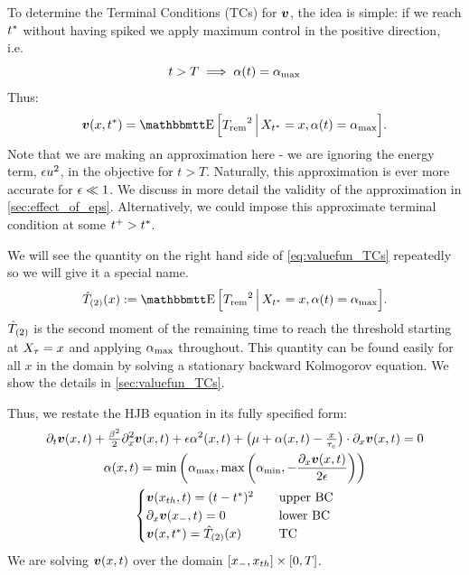 \documentclass[12pt]{iopart}
\begin{document}
To determine the Terminal Conditions (TCs) for ${ \boldsymbol{v} }$, the idea is
simple: if we reach ${ t^* }$ without having spiked we apply maximum control in the
positive direction, i.e.\ $$t>T \implies {\alpha}(t) = { {\alpha}_{\textrm{max}} }$$ Thus:
\begin{equation}\v(x,\T) =
\Exp \Big[\trem^2 \,\Big|\, X_\T = x, \a(t) = \amax \Big].
\label{eq:valuefun_TCs}
\end{equation}
Note that we are making an approximation here
- we are ignoring the energy term, ${\epsilon} u^2$, in the objective for
$t>T$. Naturally, this approximation is ever more accurate for ${\epsilon} \ll 1$.
We discuss in more detail the validity of the approximation in
\cref{sec:effect_of_eps}.
Alternatively, we could impose this approximate terminal condition at some $t^+
> { t^* }$.

We will see the quantity on the right hand side of \cref{eq:valuefun_TCs}
repeatedly so we will give it a special name.
\begin{equation}
\Ttwo(x) := \Exp \Big[\trem^2 \,\Big|\, X_\T = x, \a(t) = \amax \Big].
\label{eq:Trem_squared}
\end{equation}
${ \hat{T}_{(2)} }$ is the second moment of the remaining time to reach the
threshold starting at $X_{\tau} = x$ and applying ${ {\alpha}_{\textrm{max}} }$ throughout. This quantity can be found
easily for all $x$ in the domain by solving a stationary backward Kolmogorov
equation. We show the details in \ref{sec:valuefun_TCs}.

Thus, we restate the HJB equation in its fully specified form:
\begin{equation}
\begin{gathered}
{\partial}_t { \boldsymbol{v} }(x,t) + \tfrac{{\beta}^2}{2} {\partial}_x^2{ \boldsymbol{v} }(x,t)+
{\epsilon} {\alpha}^2(x,t) + \big({\mu } + {\alpha}(x,t) -\tfrac{x}{{ \tau_{c} }}\big)\cdot {\partial}_x{ \boldsymbol{v} }(x,t)
= 0
\\
{\alpha} (x,t) = \min \left({ {\alpha}_{\textrm{max}} }, \max\left({ {\alpha}_{\textrm{min}} }, -\frac{{\partial}_x { \boldsymbol{v} }(x,t)}{2{\epsilon}}\right)
\right)
\\
\begin{cases}
{ \boldsymbol{v} }({ x_{th} },t) = (t-{ t^* })^2  \quad & \textrm{upper BC}
\\
{\partial}_x { \boldsymbol{v} }({ x_{-} }, t)  = 0  \quad &\textrm{lower BC}
\\
{ \boldsymbol{v} }(x,{ t^* })  =
{ \hat{T}_{(2)} }(x)
\,& \textrm{TC}
\end{cases}
\end{gathered}
\label{eq:OC_LS_HJB_full}
\end{equation}
We are solving ${ \boldsymbol{v} }(x,t)$ over the domain $[{ x_{-} }, { x_{th} }] \times [0,T]$.
\end{document}
